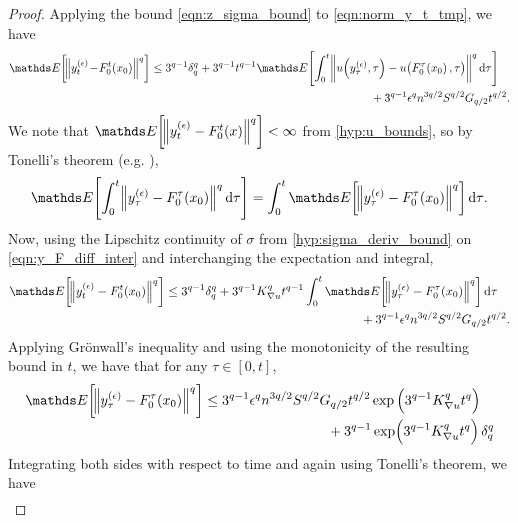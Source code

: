 \begin{proof}
	Applying the bound \eqref{eqn:z_sigma_bound} to \eqref{eqn:norm_y_t_tmp}, we have
	\begin{equation}\label{eqn:y_F_diff_inter}
		\avg{\norm{y_t^{(\epsilon)}\!-\!F_0^t\!\left(x_0\right)}^q} \leq \begin{multlined}[t]
			3^{q-1}\delta_q^q
			+ 3^{q-1}t^{q-1}\avg{\int_0^{t}{\norm{u\!\left(y_\tau^{(\epsilon)}, \tau\right) - u\!\left(F_0^{\tau}\!\left(x_0\right), \tau\right)}}^q\dif\tau} \\
			+ 3^{q-1}\epsilon^q n^{3q/2}S^{q/2} G_{q/2} t^{q/2}.
		\end{multlined}
	\end{equation}
	We note that \(\avg{\norm{y_t^{(\epsilon)} - F_0^t\!\left(x\right)}^q} < \infty\) from \ref{hyp:u_bounds}, so by Tonelli's theorem (e.g. \cite[Thm. 2.3.9]{Bremaud_2020_ProbabilityTheoryStochastic}),
	\begin{equation*}
		\avg{\int_0^{t}{\norm{y_\tau^{(\epsilon)} - F_0^\tau\!\left(x_0\right)}^q\dif\tau}} = \int_0^{t}{\avg{\norm{y_\tau^{(\epsilon)} - F_0^\tau\!\left(x_0\right)}^q}\dif\tau}.
		\label{eqn:y_tonelli}
	\end{equation*}
	Now, using the Lipschitz continuity of \(\sigma\) from \ref{hyp:sigma_deriv_bound} on \eqref{eqn:y_F_diff_inter} and interchanging the expectation and integral,
	\[
		\avg{\norm{y_t^{(\epsilon)} - F_0^t\!\left(x_0\right)}^q} \leq \begin{multlined}[t]
			3^{q-1}\delta_q^q + 3^{q-1} K_{\nabla u}^q t^{q-1} \int_0^{t}{\avg{\norm{y_\tau^{(\epsilon)} - F_0^{\tau}\!\left(x_0\right)}^q}\dif\tau} \\
			+ 3^{q-1}\epsilon^q n^{3q/2}S^{q/2} G_{q/2} t^{q/2}.
		\end{multlined}
	\]
	Applying Gr\"{o}nwall's inequality and using the monotonicity of the resulting bound in \(t\), we have that for any \(\tau \in [0,t]\),
	\[
		\avg{\norm{y_\tau^{(\epsilon)} - F_0^\tau\!\left(x_0\right)}^q}  \leq \begin{multlined}[t]
			3^{q-1}\epsilon^q n^{3q/2}S^{q/2} G_{q/2} t^{q/2}\exp\left(3^{q-1} K_{\nabla u}^q t^q\right) \\
			+ 3^{q-1}\exp\!\left(3^{q-1} K_{\nabla u}^q t^q\right)\delta_q^q
		\end{multlined}
	\]
	Integrating both sides with respect to time and again using Tonelli's theorem, we have
	\begin{align*}

\end{align*}
\end{proof}
